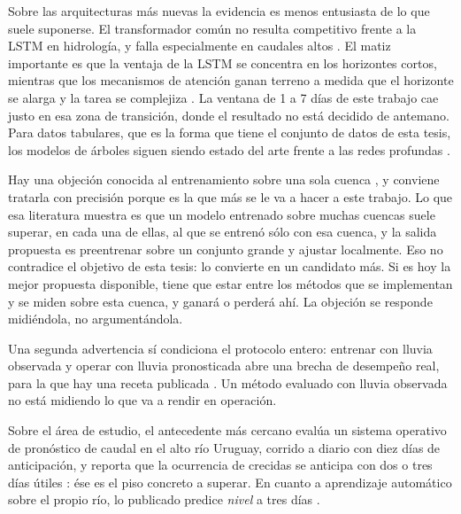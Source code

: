 Sobre las arquitecturas más nuevas la evidencia es menos entusiasta de lo que suele suponerse.
El transformador común no resulta competitivo frente a la LSTM en hidrología, y falla
especialmente en caudales altos \cite{liu-2024-transformer-limite-hidrologico}.
El matiz importante es que la ventaja de la LSTM se concentra en los horizontes cortos, mientras
que los mecanismos de atención ganan terreno a medida que el horizonte se alarga y la tarea se
complejiza \cite{liu-2025-rnn-a-transformers}.
La ventana de 1 a 7 días de este trabajo cae justo en esa zona de transición, donde el resultado
no está decidido de antemano.
Para datos tabulares, que es la forma que tiene el conjunto de datos de esta tesis, los modelos de
árboles siguen siendo estado del arte frente a las redes profundas
\cite{grinsztajn-2022-arboles-tabular}.

Hay una objeción conocida al entrenamiento sobre una sola cuenca
\cite{kratzert-2024-nunca-una-sola-cuenca}, y conviene tratarla con precisión porque es la que más
se le va a hacer a este trabajo.
Lo que esa literatura muestra es que un modelo entrenado sobre muchas cuencas suele superar, en
cada una de ellas, al que se entrenó sólo con esa cuenca, y la salida propuesta es preentrenar
sobre un conjunto grande y ajustar localmente.
Eso no contradice el objetivo de esta tesis: lo convierte en un candidato más.
Si es hoy la mejor propuesta disponible, tiene que estar entre los métodos que se implementan y se
miden sobre esta cuenca, y ganará o perderá ahí.
La objeción se responde midiéndola, no argumentándola.

Una segunda advertencia sí condiciona el protocolo entero: entrenar con lluvia observada y operar
con lluvia pronosticada abre una brecha de desempeño real, para la que hay una receta publicada
\cite{taccari-2026-aifl}.
Un método evaluado con lluvia observada no está midiendo lo que va a rendir en operación.

Sobre el área de estudio, el antecedente más cercano evalúa un sistema operativo de pronóstico de
caudal en el alto río Uruguay, corrido a diario con diez días de anticipación, y reporta que la
ocurrencia de crecidas se anticipa con dos o tres días útiles
\cite{fan-2017-uruguai-operacional}: ése es el piso concreto a superar.
En cuanto a aprendizaje automático sobre el propio río, lo publicado predice \emph{nivel} a tres
días \cite{mattiuzi-2021-m5-uruguai}.


